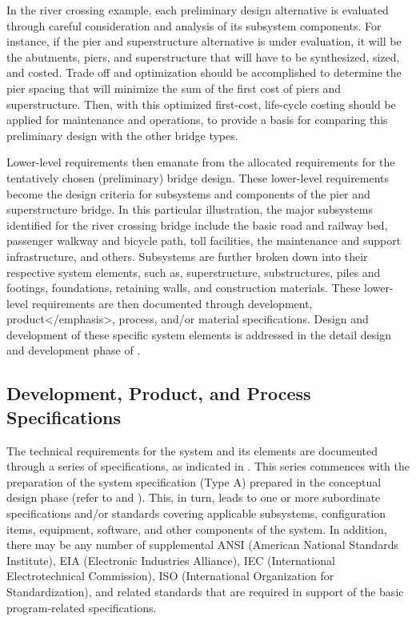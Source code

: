 In the river crossing example, each preliminary design alternative is evaluated through careful consideration and analysis of its subsystem components. For instance, if the pier and superstructure alternative is under evaluation, it will be the abutments, piers, and superstructure that will have to be synthesized, sized, and costed. Trade off and optimization should be accomplished to determine the pier spacing that will minimize the sum of the first cost of piers and superstructure. Then, with this optimized first-cost, life-cycle costing should be applied for maintenance and operations, to provide a basis for comparing this preliminary design with the other bridge types.

Lower-level requirements then emanate from the allocated requirements for the tentatively chosen (preliminary) bridge design. These lower-level requirements become the design criteria for subsystems and components of the pier and superstructure bridge. In this particular illustration, the major subsystems identified for the river crossing bridge include the basic road and railway bed, passenger walkway and bicycle path, toll facilities, the maintenance and support infrastructure, and others. Subsystems are further broken down into their respective system elements, such as, superstructure, substructures, piles and footings, foundations, retaining walls, and construction materials. These lower-level requirements are then documented through development, product</emphasis>, process, and/or material specifications. Design and development of these specific system elements is addressed in the detail design and development phase of .

\subsection{Development, Product, and Process Specifications}

The technical requirements for the system and its elements are documented through a series of specifications, as indicated in . This series commences with the preparation of the system specification (Type A) prepared in the conceptual design phase (refer to  and ). This, in turn, leads to one or more subordinate specifications and/or standards covering applicable subsystems, configuration items, equipment, software, and other components of the system. In addition, there may be any number of supplemental ANSI (American National Standards Institute), EIA (Electronic Industries Alliance), IEC (International Electrotechnical Commission), ISO (International Organization for Standardization), and related standards that are required in support of the basic program-related specifications.

